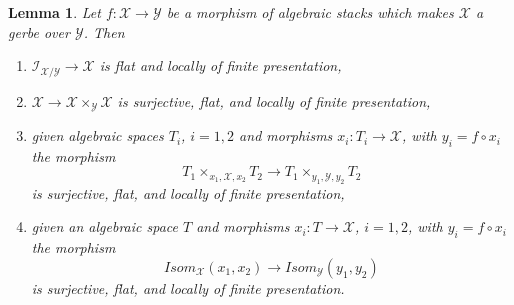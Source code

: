 \documentclass{stacks-project}
\theoremstyle{plain}
\newtheorem{lemma}[subsection]{Lemma}
\theoremstyle{definition}
\theoremstyle{remark}
\numberwithin{equation}{subsection}
\begin{document}
\begin{lemma}
\label{lemma-gerbe-isom-fppf}
Let $f : \mathcal{X} \to \mathcal{Y}$ be a morphism of algebraic stacks
which makes $\mathcal{X}$ a gerbe over $\mathcal{Y}$. Then
\begin{enumerate}
\item $\mathcal{I}_{\mathcal{X}/\mathcal{Y}} \to \mathcal{X}$
is flat and locally of finite presentation,
\item $\mathcal{X} \to \mathcal{X} \times_\mathcal{Y} \mathcal{X}$
is surjective, flat, and locally of finite presentation,
\item given algebraic spaces $T_i$, $i = 1, 2$ and morphisms
$x_i : T_i \to \mathcal{X}$, with $y_i = f \circ x_i$ the morphism
$$
T_1 \times_{x_1, \mathcal{X}, x_2} T_2 \longrightarrow
T_1 \times_{y_1, \mathcal{Y}, y_2} T_2
$$
is surjective, flat, and locally of finite presentation,
\item given an algebraic space $T$ and morphisms
$x_i : T \to \mathcal{X}$, $i = 1, 2$, with $y_i = f \circ x_i$ the morphism
$$
\mathit{Isom}_\mathcal{X}(x_1, x_2) \longrightarrow
\mathit{Isom}_\mathcal{Y}(y_1, y_2)
$$
is surjective, flat, and locally of finite presentation.
\end{enumerate}
\end{lemma}
\end{document}
